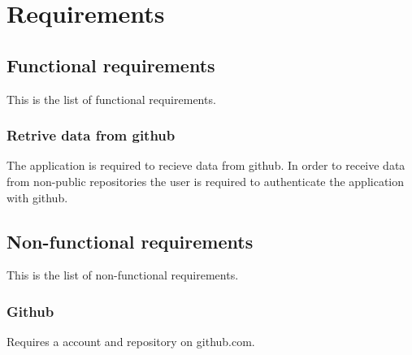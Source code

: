 \chapter{Requirements}
\section{Functional requirements}
This is the list of functional requirements.
\subsection{Retrive data from github}
The application is required to recieve data from github. In order to receive data from non-public repositories the user is required to authenticate the application with github.

\section{Non-functional requirements}
This is the list of non-functional requirements.
\subsection{Github}
Requires a account and repository on github.com.
\subsection{}